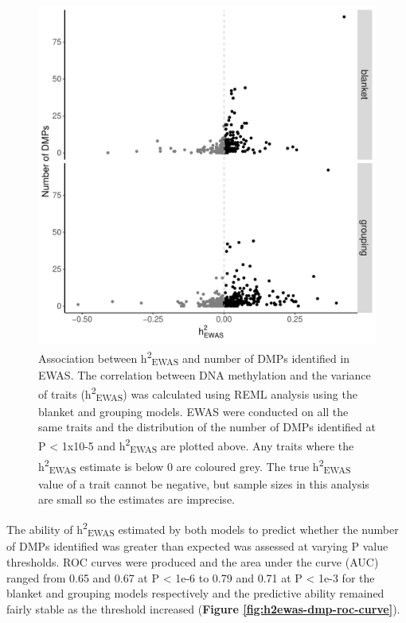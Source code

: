 \documentclass[11pt,oneside]{bristolthesis}
\begin{document}
\begin{figure}

{\centering \includegraphics[width=1\linewidth]{figure/05-h2ewas/m2_hit_count_scatter_p5_test} 

}

\caption{Association between h\textsuperscript{2}\textsubscript{EWAS} and number of DMPs identified in EWAS. The correlation between DNA methylation and the variance of traits (h\textsuperscript{2}\textsubscript{EWAS}) was calculated using REML analysis using the blanket and grouping models. EWAS were conducted on all the same traits and the distribution of the number of DMPs identified at P \textless{} 1x10-5 and h\textsuperscript{2}\textsubscript{EWAS} are plotted above. Any traits where the h\textsuperscript{2}\textsubscript{EWAS} estimate is below 0 are coloured grey. The true h\textsuperscript{2}\textsubscript{EWAS} value of a trait cannot be negative, but sample sizes in this analysis are small so the estimates are imprecise.}\label{fig:dmps-and-h2ewas}
\end{figure}
The ability of h\textsuperscript{2}\textsubscript{EWAS} estimated by both models to predict whether the number of DMPs identified was greater than expected was assessed at varying P value thresholds. ROC curves were produced and the area under the curve (AUC) ranged from 0.65 and 0.67 at P \textless{} 1e-6 to 0.79 and 0.71 at P \textless{} 1e-3 for the blanket and grouping models respectively and the predictive ability remained fairly stable as the threshold increased (\textbf{Figure \ref{fig:h2ewas-dmp-roc-curve}}).
\end{document}
